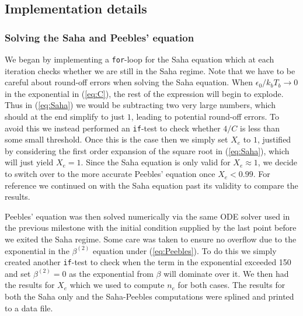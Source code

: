\documentclass[%
reprint,
 amsmath,amssymb,
 aps,
]{revtex4-2}
\begin{document}
\subsection{Implementation details}
\subsubsection{Solving the Saha and Peebles' equation}
We began by implementing a \texttt{for}-loop for the Saha equation which at each iteration checks whether we are still in the Saha regime. Note that we have to be careful about round-off errors when solving the Saha equation. When $\epsilon_0/k_bT_b\to0$ in the exponential in (\ref{eq:C}), the rest of the expression will begin to explode. Thus in (\ref{eq:Saha}) we would be subtracting two very large numbers, which should at the end simplify to just $1$, leading to potential round-off errors. To avoid this we instead performed an \texttt{if}-test to check whether $4/C$ is less than some small threshold. Once this is the case then we simply set $X_e$ to $1$, justified by considering the first order expansion of the square root in (\ref{eq:Saha}), which will just yield $X_e=1$. Since the Saha equation is only valid for $X_e\approx1$, we decide to switch over to the more accurate Peebles' equation once $X_e<0.99$. For reference we continued on with the Saha equation past its validity to compare the results. 

Peebles' equation was then solved numerically via the same ODE solver used in the previous milestone with the initial condition supplied by the last point before we exited the Saha regime. Some care was taken to ensure no overflow due to the exponential in the $\beta^{(2)}$ equation under (\ref{eq:Peebles}). To do this we simply created another \texttt{if}-test to check when the term in the exponential exceeded 150 and set $\beta^{(2)}=0$ as the exponential from $\beta$ will dominate over it. We then had the results for $X_e$ which we used to compute $n_e$ for both cases. The results for both the Saha only and the Saha-Peebles computations were splined and printed to a data file.
\end{document}
